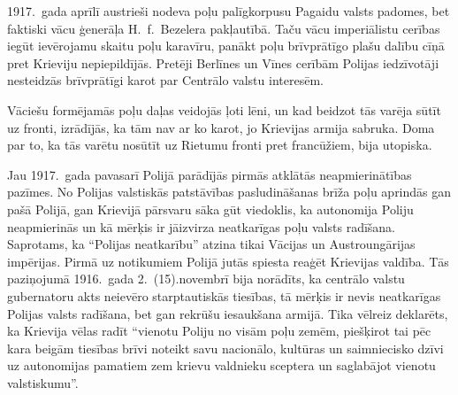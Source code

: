 \documentclass[twoside,a5paper,12pt,fleqn,openany]{extbook}
\begin{document}
1917.~gada aprīlī austrieši nodeva poļu palīgkorpusu Pagaidu valsts padomes, bet faktiski vācu ģenerāļa H.~f.~Bezelera pakļautībā. Taču vācu imperiālistu cerības iegūt ievērojamu skaitu poļu karavīru, panākt poļu brīvprātīgo plašu dalību cīņā pret Krieviju nepiepildījās. Pretēji Berlīnes un Vīnes cerībām Polijas iedzīvotāji nesteidzās brīvprātīgi karot par Centrālo valstu interesēm.

Vāciešu formējamās poļu daļas veidojās ļoti lēni, un kad beidzot tās varēja sūtīt uz fronti, izrādījās, ka tām nav ar ko karot, jo Krievijas armija sabruka. Doma par to, ka tās varētu nosūtīt uz Rietumu fronti pret francūžiem, bija utopiska.

Jau 1917.~gada pavasarī Polijā parādījās pirmās atklātās neapmierinātības pazīmes. No Polijas valstiskās patstāvības pasludināšanas brīža poļu aprindās gan pašā Polijā, gan Krievijā pārsvaru sāka gūt viedoklis, ka autonomija Poliju neapmierinās un kā mērķis ir jāizvirza neatkarīgas poļu valsts radīšana. Saprotams, ka ``Polijas neatkarību'' atzina tikai Vācijas un Austroungārijas impērijas. Pirmā uz notikumiem Polijā jutās spiesta reaģēt Krievijas valdība. Tās paziņojumā 1916.~gada 2.~(15).novembrī bija norādīts, ka centrālo valstu gubernatoru akts neievēro starptautiskās tiesības, tā mērķis ir nevis neatkarīgas Polijas valsts radīšana, bet gan rekrūšu iesaukšana armijā. Tika vēlreiz deklarēts, ka Krievija vēlas radīt ``vienotu Poliju no visām poļu zemēm, piešķirot tai pēc kara beigām tiesības brīvi noteikt savu nacionālo, kultūras un saimniecisko dzīvi uz autonomijas pamatiem zem krievu valdnieku sceptera un saglabājot vienotu valstiskumu''.
\end{document}
